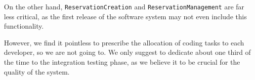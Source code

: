 On the other hand, \texttt{Res\-er\-va\-tion\-Cre\-ation} and \texttt{Res\-er\-va\-tion\-Man\-age\-ment} are far less critical, as the first release of the software system may not even include this functionality. 

However, we find it pointless to prescribe the allocation of coding tasks to each developer, so we are not going to. We only suggest to dedicate about one third of the time to the integration testing phase, as we believe it to be crucial for the quality of the system.








\begin{comment}
	




\begin{figure*}%
	
	\caption{myTaxiService Gantt chart.}\label{fig:gantt1}
\end{figure*}


\begin{figure*}
	\newlength{\imagewidth}%
	\settowidth\imagewidth{}%
	
\end{figure*}



The following phases are identified:\begin{description}
	\item [\normalfont\texttt{RASD}] requirements analysis and specification; the resulting document, which required three weeks, was delivered on \printdate{2015-11-6}.
	\item [\normalfont\texttt{DD}] designing; the resulting document, which required four weeks, was delivered on \printdate{2015-12-4}.
	\item [\normalfont\texttt{ITPD}] integration testing plan; the resulting document, which required three weeks, was delivered on \printdate{2016-1-21} (notice that there is a temporal hiatus between the previous phase and this one).
	\item [\normalfont\texttt{PPD}] project planning; the resulting document, which required three weeks, is this one, and is going to be delivered on \printdate{2016-2-2}.
	\item [\normalfont\texttt{Dev}] development and unit testing; this phase will require about 21 weeks; in a few lines, we are going to detail this phase.
	\item [\normalfont\texttt{Int}] integration and testing; eight weeks will be dedicated to this phase.
\end{description}




\end{comment}

